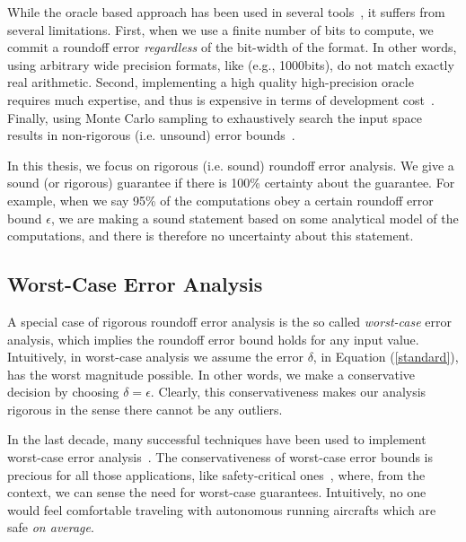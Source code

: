 While the oracle based approach has been used in several tools~\cite{landau2014guide, kahan1996improbability, atomic, blame, herbie}, it suffers from several limitations.
%
First, when we use a finite number of bits to compute, we commit a roundoff error \emph{regardless} of the bit-width of the format.
%
In other words, using arbitrary wide precision formats, like (e.g., 1000bits), do not match exactly real arithmetic.
%
Second, implementing a high quality high-precision oracle requires much expertise, and thus is expensive in terms of development cost~\cite{atomic}.
%
Finally, using Monte Carlo sampling to exhaustively search the input space results in non-rigorous (i.e. unsound) error bounds~\cite{glasserman2013monte, parker2000monte}.
%

In this thesis, we focus on rigorous (i.e. sound) roundoff error analysis.
%
We give a sound (or rigorous) guarantee if there is 100\% certainty about the guarantee.
%
%
For example, when we say 95\% of the computations obey a certain roundoff error bound $\epsilon$, we are making a sound statement based on some analytical model of the computations, and there is therefore no uncertainty about this statement.
%
%
\subsection{Worst-Case Error Analysis}
\label{sec:worst}
%
A special case of rigorous roundoff error analysis is the so called \emph{worst-case} error analysis, which implies the roundoff error bound holds for any input value.
%
Intuitively, in worst-case analysis we assume the error $\delta$, in Equation (\ref{standard}), has the worst magnitude possible. In other words, we make a conservative decision by choosing $\delta=\epsilon$.
%
Clearly, this conservativeness makes our analysis rigorous in the sense there cannot be any outliers.
%

In the last decade, many successful techniques have been used to implement worst-case error analysis~\cite{darulova2018daisy,2015_fm_sjrg,solovyev2018rigorous,rosa,fptuner,smartfloat,satire,gappa,fluctuat}.
%
%
The conservativeness of worst-case error bounds is precious for all those applications, like safety-critical ones~\cite{guardstable, cpralg}, where, from the context, we can sense the need for worst-case guarantees.
%
Intuitively, no one would feel comfortable traveling with autonomous running aircrafts which are safe \emph{on average}.


